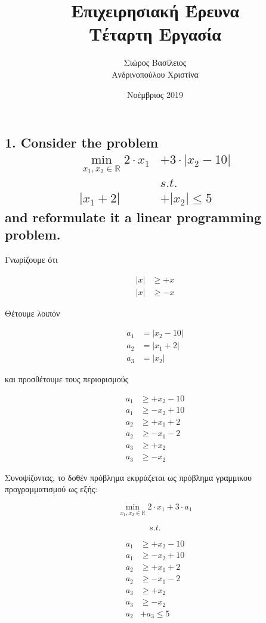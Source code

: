 \documentclass[12pt]{article}
\title{\hugeΑλγοριθμική Επιχειρησιακή Έρευνα\\Τέταρτη Εργασία}
\author{Σιώρος Βασίλειος\\Ανδρινοπούλου Χριστίνα}
\date{Νοέμβριος 2019}
\newcommand{\R}{\mathbb{R}}
\newcommand{\abs}[1]{\left\lvert#1\right\rvert}
\begin{document}
\maketitle


\pagebreak


\subsection*{1. Consider the problem
\begin{align*}
    \min_{x_1, x_2 \in \R} 2 \cdot x_1 & + 3 \cdot \abs{x_2 - 10} \\
    &s.t. \\
    \abs{x_1 + 2} & + \abs{x_2} \leq 5
\end{align*}
and reformulate it a linear programming problem.}

Γνωρίζουμε ότι

\begin{align*}
    \abs{x} & \geq +x \\
    \abs{x} & \geq -x
\end{align*}

Θέτουμε λοιπόν

\begin{align*}
    a_1 & = \abs{x_2 - 10} \\
    a_2 & = \abs{x_1 + 2} \\
    a_3 & = \abs{x_2}
\end{align*}

και προσθέτουμε τους περιορισμούς

\begin{align*}
    a_1 & \geq +x_2 - 10 \\
    a_1 & \geq -x_2 + 10 \\
    a_2 & \geq +x_1 + 2 \\
    a_2 & \geq -x_1 - 2 \\
    a_3 & \geq +x_2 \\
    a_3 & \geq -x_2
\end{align*}

Συνοψίζοντας, το δοθέν πρόβλημα εκφράζεται ως πρόβλημα γραμμικου προγραμματισμού ως εξής:

\[ \min_{x_1, x_2 \in \R} 2 \cdot x_1 + 3 \cdot a_1 \]

\[ s.t. \]

\begin{align*}
    a_1 & \geq +x_2 - 10 \\
    a_1 & \geq -x_2 + 10 \\
    a_2 & \geq +x_1 + 2 \\
    a_2 & \geq -x_1 - 2 \\
    a_3 & \geq +x_2 \\
    a_3 & \geq -x_2 \\
    a_2 & + a_3 \leq 5
\end{align*}
\end{document}

